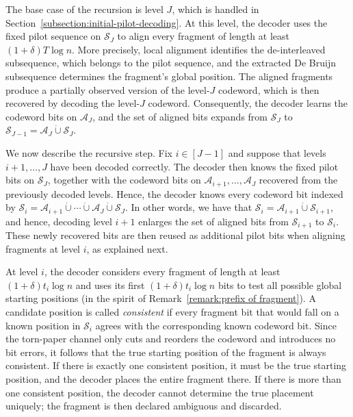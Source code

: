 \documentclass[journal,letterpaper,onecolumn,11pt]{IEEEtran}
\newcommand{\cA}{\mathcal{A}}
\newcommand{\cS}{\mathcal{S}}
\begin{document}
The base case of the recursion is level \(J\), which is handled in
Section~\ref{subsection:initial-pilot-decoding}. 
At this level, the decoder uses the fixed pilot sequence on \(\cS_J\) to align every fragment of length at least \((1+\delta)T\log n\). 
More precisely, local alignment identifies the de-interleaved subsequence, which belongs to the pilot sequence, and the extracted De Bruijn
subsequence determines the fragment's global position. 
The aligned fragments produce a partially observed version of the level-\(J\) codeword, which is then
recovered by decoding the level-\(J\) codeword. 
Consequently, the decoder learns the codeword bits on \(\cA_J\), and the set of aligned bits expands from \(\cS_J\) to \(\cS_{J-1}=\cA_J\mathbin{\dot\cup}\cS_J\).

We now describe the recursive step. Fix \(i\in[J-1]\) and suppose that
levels \(i+1,\ldots,J\) have been decoded correctly. 
The decoder then knows the fixed pilot bits on \(\cS_J\), together with the codeword bits on \(\cA_{i+1},\ldots,\cA_J\) recovered from the previously decoded levels.
Hence, the decoder knows every codeword bit indexed by \(\cS_i=\cA_{i+1}\mathbin{\dot\cup}\cdots\mathbin{\dot\cup}\cA_J\mathbin{\dot\cup}\cS_J\). 
In other words, we have that \(\cS_i=\cA_{i+1}\mathbin{\dot\cup}\cS_{i+1}\), and hence, decoding level
\(i+1\) enlarges the set of aligned bits from \(\cS_{i+1}\) to \(\cS_i\). 
These newly recovered bits are then reused as additional pilot bits when aligning fragments at level \(i\), as explained next.

At level \(i\), the decoder considers every fragment of length at least
\((1+\delta)t_i\log n\) and uses its first \((1+\delta)t_i\log n\) bits to test all possible global starting positions (in the spirit of Remark~\ref{remark:prefix of fragment}). 
A candidate position is called \textit{consistent} if every fragment bit
that would fall on a known position in \(\cS_i\) agrees with the
corresponding known codeword bit. 
Since the torn-paper channel only cuts and reorders the codeword and introduces no bit errors, it follows that the true starting position of the fragment is always consistent.
If there is exactly one consistent position, it must be the true starting position, and the decoder places the entire fragment there. 
If there is more than one consistent position, the decoder cannot determine the true placement uniquely; the fragment is then declared ambiguous and discarded.
\end{document}
